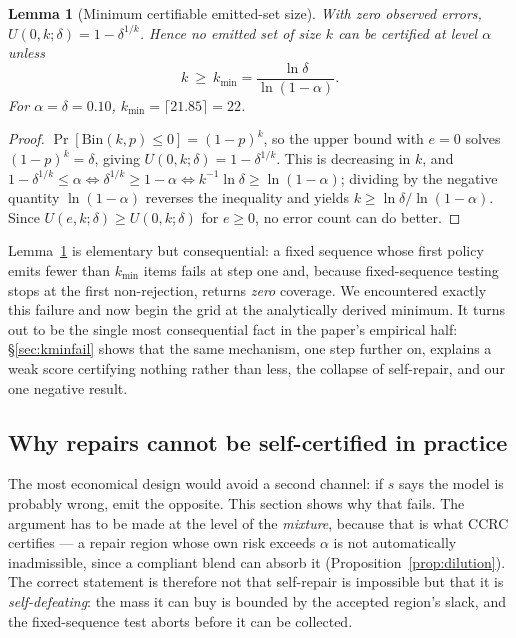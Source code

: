 \documentclass[review,number,doubleblind]{elsarticle}
\theoremstyle{plain}
\newtheorem{lemma}{Lemma}
\theoremstyle{definition}
\theoremstyle{remark}
\begin{document}
\begin{lemma}[Minimum certifiable emitted-set size]
\label{lem:kmin}
With zero observed errors, $U(0,k;\delta)=1-\delta^{1/k}$. Hence no emitted set of size
$k$ can be certified at level $\alpha$ unless
\[
k\ \ge\ k_{\min}=\frac{\ln\delta}{\ln(1-\alpha)} .
\]
For $\alpha=\delta=0.10$, $k_{\min}=\lceil 21.85\rceil=22$.
\end{lemma}

\begin{proof}
$\Pr[\mathrm{Bin}(k,p)\le 0]=(1-p)^k$, so the upper bound with $e=0$ solves
$(1-p)^k=\delta$, giving $U(0,k;\delta)=1-\delta^{1/k}$. This is decreasing in $k$, and
$1-\delta^{1/k}\le\alpha\iff\delta^{1/k}\ge1-\alpha\iff k^{-1}\ln\delta\ge\ln(1-\alpha)$;
dividing by the negative quantity $\ln(1-\alpha)$ reverses the inequality and yields
$k\ge\ln\delta/\ln(1-\alpha)$. Since $U(e,k;\delta)\ge U(0,k;\delta)$ for $e\ge0$, no error
count can do better.
\end{proof}

Lemma~\ref{lem:kmin} is elementary but consequential: a fixed sequence whose first policy
emits fewer than $k_{\min}$ items fails at step one and, because fixed-sequence testing
stops at the first non-rejection, returns \emph{zero} coverage. We encountered exactly this
failure and now begin the grid at the analytically derived minimum. It turns out to be the
single most consequential fact in the paper's empirical half: \S\ref{sec:kminfail} shows that
the same mechanism, one step further on, explains a weak score certifying nothing rather than
less, the collapse of self-repair, and our one negative result.

\subsection{Why repairs cannot be self-certified in practice}
\label{sec:independence}

The most economical design would avoid a second channel: if $s$ says the model is probably
wrong, emit the opposite. This section shows why that fails. The argument has to be made at
the level of the \emph{mixture}, because that is what CCRC certifies --- a repair region
whose own risk exceeds $\alpha$ is not automatically inadmissible, since a compliant blend
can absorb it (Proposition~\ref{prop:dilution}). The correct statement is therefore not
that self-repair is impossible but that it is \emph{self-defeating}: the mass it can buy is
bounded by the accepted region's slack, and the fixed-sequence test aborts before it can be
collected.
\end{document}
